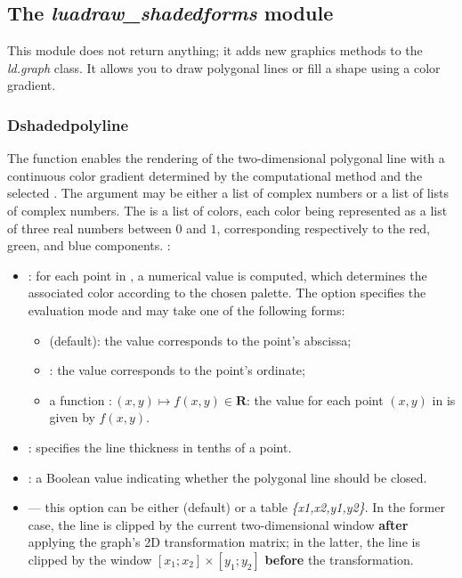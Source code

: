 \subsection{The \emph{luadraw\_shadedforms} module}

This module does not return anything; it adds new graphics methods to the \emph{ld.graph} class. It allows you to draw polygonal lines or fill a shape using a color gradient.

\subsubsection{Dshadedpolyline}

The function  enables the rendering of the two-dimensional polygonal line  with a continuous color gradient determined by the computational method and the selected . The argument  may be either a list of complex numbers or a list of lists of complex numbers. The  is a list of colors, each color being represented as a list of three real numbers between \(0\) and \(1\), corresponding respectively to the red, green, and blue components. \writeoptions:
\begin{itemize}
    \item {}: for each point in , a numerical value is computed, which determines the associated color according to the chosen palette. The  option specifies the evaluation mode and may take one of the following forms:
        \begin{itemize}
            \item {} (default): the value corresponds to the point’s abscissa;
            \item {}: the value corresponds to the point’s ordinate;
            \item a function \(\colon(x,y)\mapsto f(x,y)\in\mathbf{R}\): the value for each point \((x,y)\) in  is given by \(f(x,y)\).
        \end{itemize}
    \item {}: specifies the line thickness in tenths of a point.
    \item {}: a Boolean value indicating whether the polygonal line should be closed.
    \item {} — this option can be either \nil (default) or a table \emph{\{x1,x2,y1,y2\}}. In the former case, the line is clipped by the current two-dimensional window \textbf{after} applying the graph’s 2D transformation matrix; in the latter, the line is clipped by the window \([x_1;x_2]\times[y_1;y_2]\) \textbf{before} the transformation.
\end{itemize}

